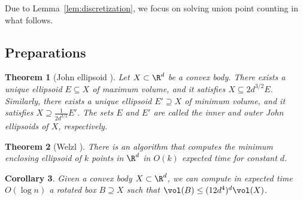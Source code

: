 \documentclass[a4paper, 11pt]{article}
\newtheorem{theorem}{Theorem}[section]
\newtheorem{corollary}[theorem]{Corollary}
\begin{document}
Due to Lemma~\ref{lem:discretization}, we focus on solving union point counting in what follows.

\subsection{Preparations}

\begin{theorem}[John ellipsoid \cite{John48}]
    \label{thm:john-ellipsoid}
    Let $X \subset \R^d$ be a convex body. There exists a unique ellipsoid $E \subseteq X$ of maximum volume, and it satisfies $X \subseteq 2d^{3/2} E$. Similarly, there exists a unique ellipsoid $E' \supseteq X$ of minimum volume, and it satisfies $X \supseteq \frac{1}{2d^{3/2}} E'$. The sets $E$ and $E'$ are called the inner and outer \emph{John ellipsoids} of $X$, respectively.
\end{theorem}

\begin{theorem}[Welzl \cite{Welzl05}]
    \label{thm:min-ellipsoid}
    There is an algorithm that computes the minimum enclosing ellipsoid of $k$ points in $\R^d$ in $O(k)$ expected time for constant $d$.
\end{theorem}

\begin{corollary}
    \label{cor:bounding-box}
    Given a convex body $X \subset \R^d$, we can compute in expected time $O(\log n)$ a rotated box $B \supseteq X$ such that $\vol(B) \leq (12d^4)^d \vol(X)$.
\end{corollary}
\end{document}
